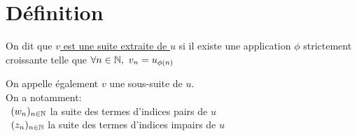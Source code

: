 \documentclass[12pt,twoside,a4paper]{article}
\author{MPSI 2}
\begin{document}
	\maketitle
	\section{D\'efinition}
		\begin{defi}
			On dit que \underline{$v$ est une suite extraite de $u$} si il existe une application $\phi$ strictement croissante telle que $\forall n\in\mathbb{N},\ v_n=u_{\phi(n)}$
		\end{defi}
		\begin{flushleft}
			On appelle \'egalement $v$ une sous-suite de $u$.\\
			On a notamment:\\
			\textbullet\ $(w_n)_{n\in\mathbb{N}}$ la suite des termes d'indices pairs de $u$\\
			\textbullet\ $(z_n)_{n\in\mathbb{N}}$ la suite des termes d'indices impairs de $u$
		\end{flushleft}
\end{document}
